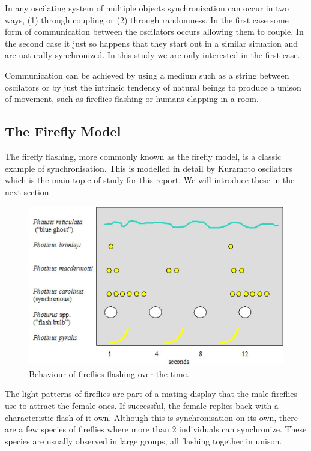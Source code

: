 In any oscilating system of multiple objects synchronization can occur in two ways, (1) through coupling or (2) through randomness. In the first case some form of communication between the oscilators occurs allowing them to couple. In the second case it just so happens that they start out in a similar situation and are naturally synchronized. In this study we are only interested in the first case. 

Communication can be achieved by using a medium such as a string between oscilators or by just the intrinsic tendency of natural beings to produce a unison of movement, such as fireflies flashing or humans clapping in a room. 

\subsection{The Firefly Model}

The firefly flashing, more commonly known as the firefly model, is a classic example of synchronisation. This is modelled in detail by Kuramoto oscilators which is the main topic of study for this report. We will introduce these in the next section. 

\begin{figure}[h]
	\centering
	\includegraphics[width=\textwidth]{imgs/flash}
	\caption{Behaviour of fireflies flashing over the time. }
	\label{fig:intro_flash}
\end{figure}
 
The light patterns of fireflies are part of a mating display that the male fireflies use to attract the female ones. If successful, the female replies back with a characteristic flash of it own. Although this is synchronisation on its own, there are a few species of fireflies where more than 2 individuals can synchronize. These species are usually observed in large groups, all flashing together in unison.


